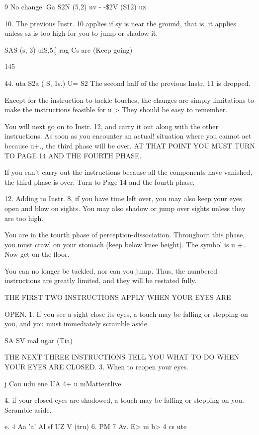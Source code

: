 \documentclass[10pt,twoside]{memoir}
\begin{document}
\begin{enumerate}
{\begin{enumerate}
\begin{sysrules}
\begin{sysrules}
\begin{sysrules}
\begin{sysrules}
{\begin{enumerate}
\begin{sysrules}
\begin{enumerate}
9 No change. 
Ga S2N (5,2) uv 
- -\$2V (S12) uz %


10. The previous Instr. 10 applies if sy is near the ground, that is, it 
applies unless sz is too high for you to jump or shadow it. 


SAS (s, 3) ulS,5;] 
rag Cs are 
(Keep going) 


145 


44. uta S2a ( S, 1s.) U= S2 
The second half of the previous Instr. 11 is dropped. 


Except for the instruction to tackle touches, the changes are simply 
limitations to make the instructions feasible for u > They should be easy 
to remember. 


You will next go on to Instr. 12, and carry it out along with the other 
instructions. As soon as you encounter an actual! situation where you cannot 
act because u+., the third phase will be over. AT THAT POINT YOU 
MUST TURN TO PAGE 14 AND THE FOURTH PHASE. 


If you can't carry out the instructions because all the components have 
vanished, the third phase is over. Turn to Page 14 and the fourth phase. 


12. Adding to Instr. 8, if you have time left over, you may also keep 
your eyes open and blow on sights. You may also shadow or jump over 
sights unless they are too high. 


You are in the tourth phase of perception-dissociation. Throughout this 
phase, you must crawl on your stomach (keep below knee height). The 
symbol is u +.. Now get on the floor. 

You can no longer be tackled, nor can you jump. Thus, the numbered 
instructions are greatly limited, and they will be restated fully. 

THE FIRST TWO INSTRUCTIONS APPLY WHEN YOUR EYES ARE 


OPEN. 
1. If you see a sight close its eyes, a touch may be falling or stepping 
on you, and you must immediately scramble aside. 


SA SV mal 
ugar (Tia) 


THE NEXT THREE INSTRUCTIONS TELL YOU WHAT TO DO 
WHEN YOUR EYES ARE CLOSED. 
3. When to reopen your eyes. 


j Cou 
udu ene UA 
4+ u mMattentlive 


4. if your closed eyes are shadowed, a touch may be falling or 
stepping on you. Scramble aside. 


e. 4 Aa 'a' Al sf 
UZ V (tru) 
6. PM 
7 Av. E> ui b> 
4 cs ute 



\end{enumerate}
\end{sysrules}
\end{enumerate}}
\end{sysrules}
\end{sysrules}
\end{sysrules}
\end{sysrules}
\end{enumerate}}
\end{enumerate}
\end{document}
